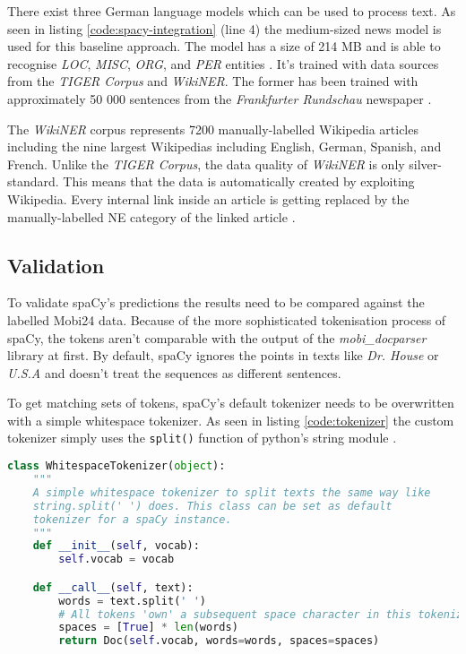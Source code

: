 There exist three German language models which can be used to process text. As seen in listing \ref{code:spacy-integration} (line 4) the medium-sized news model is used for this baseline approach. The model has a size of 214 MB and is able to recognise \emph{LOC}, \emph{MISC}, \emph{ORG}, and \emph{PER} entities \cite{gh-spacy}. It's trained with data sources from the \emph{TIGER Corpus} and \emph{WikiNER}. The former has been trained with approximately 50 000 sentences from the \emph{Frankfurter Rundschau} newspaper \cite{tiger}.

The \emph{WikiNER} corpus represents 7200 manually-labelled Wikipedia articles including the nine largest Wikipedias including English, German, Spanish, and French. Unlike the \emph{TIGER Corpus}, the data quality of \emph{WikiNER} is only silver-standard. This means that the data is automatically created by exploiting Wikipedia. Every internal link inside an article is getting replaced by the manually-labelled NE category of the linked article \cite{Nothman}.

\subsection{Validation}

To validate spaCy's predictions the results need to be compared against the labelled Mobi24 data. Because of the more sophisticated tokenisation process of spaCy, the tokens aren't comparable with the output of the \emph{mobi\_docparser} library at first. By default, spaCy ignores the points in texts like \emph{Dr. House} or \emph{U.S.A} and doesn't treat the sequences as different sentences.

To get matching sets of tokens, spaCy's default tokenizer needs to be overwritten with a simple whitespace tokenizer. As seen in listing \ref{code:tokenizer} the custom tokenizer simply uses the \verb|split()| function of python's string module \cite{spacy-tok}.

\begin{lstlisting}[language=Python, label={code:tokenizer}, caption=Custom whitespace tokenizer]
class WhitespaceTokenizer(object):
    """
    A simple whitespace tokenizer to split texts the same way like
    string.split(' ') does. This class can be set as default
    tokenizer for a spaCy instance.
    """
    def __init__(self, vocab):
        self.vocab = vocab

    def __call__(self, text):
        words = text.split(' ')
        # All tokens 'own' a subsequent space character in this tokenizer
        spaces = [True] * len(words)
        return Doc(self.vocab, words=words, spaces=spaces)
\end{lstlisting}

